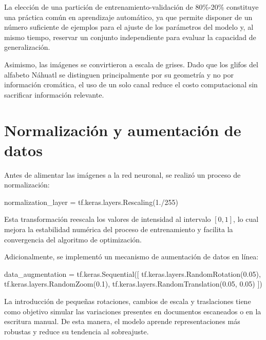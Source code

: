 \documentclass[
  spanish,
  us-letterpaper,
  DIV=11,
  numbers=noendperiod]{scrreprt}
\newenvironment{Shaded}{\begin{snugshade}}{\end{snugshade}}
\newcommand{\DecValTok}[1]{\textcolor[rgb]{0.68,0.00,0.00}{#1}}
\newcommand{\FloatTok}[1]{\textcolor[rgb]{0.68,0.00,0.00}{#1}}
\newcommand{\NormalTok}[1]{\textcolor[rgb]{0.00,0.23,0.31}{#1}}
\newcommand{\OperatorTok}[1]{\textcolor[rgb]{0.37,0.37,0.37}{#1}}
\begin{document}
La elección de una partición de entrenamiento-validación de 80\%-20\%
constituye una práctica común en aprendizaje automático, ya que permite
disponer de un número suficiente de ejemplos para el ajuste de los
parámetros del modelo y, al mismo tiempo, reservar un conjunto
independiente para evaluar la capacidad de generalización.

Asimismo, las imágenes se convirtieron a escala de grises. Dado que los
glifos del alfabeto Náhuatl se distinguen principalmente por su
geometría y no por información cromática, el uso de un solo canal reduce
el costo computacional sin sacrificar información relevante.

\section{Normalización y aumentación de
datos}\label{normalizaciuxf3n-y-aumentaciuxf3n-de-datos}

Antes de alimentar las imágenes a la red neuronal, se realizó un proceso
de normalización:

\begin{Shaded}
\begin{Highlighting}[]
\NormalTok{normalization\_layer }\OperatorTok{=}\NormalTok{ tf.keras.layers.Rescaling(}\FloatTok{1.}\OperatorTok{/}\DecValTok{255}\NormalTok{)}
\end{Highlighting}
\end{Shaded}

Esta transformación reescala los valores de intensidad al intervalo
\([0,1]\), lo cual mejora la estabilidad numérica del proceso de
entrenamiento y facilita la convergencia del algoritmo de optimización.

Adicionalmente, se implementó un mecanismo de aumentación de datos en
línea:

\begin{Shaded}
\begin{Highlighting}[]
\NormalTok{data\_augmentation }\OperatorTok{=}\NormalTok{ tf.keras.Sequential([}
\NormalTok{    tf.keras.layers.RandomRotation(}\FloatTok{0.05}\NormalTok{),}
\NormalTok{    tf.keras.layers.RandomZoom(}\FloatTok{0.1}\NormalTok{),}
\NormalTok{    tf.keras.layers.RandomTranslation(}\FloatTok{0.05}\NormalTok{, }\FloatTok{0.05}\NormalTok{)}
\NormalTok{])}
\end{Highlighting}
\end{Shaded}

La introducción de pequeñas rotaciones, cambios de escala y traslaciones
tiene como objetivo simular las variaciones presentes en documentos
escaneados o en la escritura manual. De esta manera, el modelo aprende
representaciones más robustas y reduce su tendencia al sobreajuste.
\end{document}
